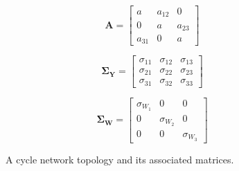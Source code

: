 \documentclass{article}
\begin{document}
\begin{figure}[H]
\centering

\def\figscale{1}

\begin{minipage}[c]{0.23\textwidth}
\centering

\def\a{1.2 cm}
\def\nodeSize{0.7}
\def\selfLoopR{0.5*\nodeSize cm}


\end{minipage}%
\hspace{0\textwidth}%
\begin{minipage}[c]{0.23\textwidth}
\raggedright

\[
\mathbf{A}=
\begin{bmatrix}
a & a_{12} & 0 \\
0 & a & a_{23} \\
a_{31} & 0 & a
\end{bmatrix}
\]

\end{minipage}%
\hspace{0.005\textwidth}%
\begin{minipage}[c]{0.25\textwidth}
\raggedright

\[
\mathbf{\Sigma_Y}=
\begin{bmatrix}
\sigma_{11} & \sigma_{12} & \sigma_{13} \\
\sigma_{21} & \sigma_{22} & \sigma_{23} \\
\sigma_{31} & \sigma_{32} & \sigma_{33}
\end{bmatrix}
\]

\end{minipage}%
\hspace{0.005\textwidth}%
\begin{minipage}[c]{0.27\textwidth}
\raggedright

\[
\mathbf{\Sigma_W}=
\begin{bmatrix}
\sigma_{W_1} & 0 & 0 \\
0 & \sigma_{W_2} & 0 \\
0 & 0 & \sigma_{W_3}
\end{bmatrix}
\]

\end{minipage}%

\caption{A cycle network topology and its associated matrices.}
\label{fig:network_cycle}
\end{figure}
\end{document}
